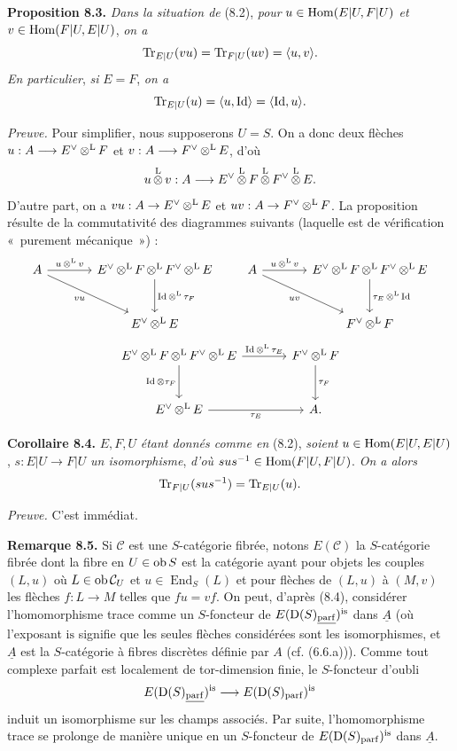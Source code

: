 \documentclass[11pt]{article}
\begin{document}
\textbf{Proposition 8.3.} \emph{Dans la situation de} (8.2), \emph{pour} \(u\in\operatorname{Hom}(E|U,F|U)\) \emph{et} \(v\in\operatorname{Hom}(F|U,E|U)\), \emph{on a}
\[
  \operatorname{Tr}_{E|U}(vu)=\operatorname{Tr}_{F|U}(uv)=\langle u,v\rangle.
\]
\emph{En particulier}, \emph{si} \(E=F\), \emph{on a}
\[
  \operatorname{Tr}_{E|U}(u)=\langle u,\operatorname{Id}\rangle=\langle\operatorname{Id},u\rangle.
\]

\emph{Preuve.} Pour simplifier, nous supposerons \(U=S\). On a donc deux flèches \(u:A\longrightarrow E^\vee\mathop{\otimes}^{\mathrm L} F\) et \(v:A\longrightarrow F^\vee\mathop{\otimes}^{\mathrm L} E\), d'où
\[
  u\mathop{\otimes}^{\mathrm L} v:A\longrightarrow E^\vee\mathop{\otimes}^{\mathrm L} F\mathop{\otimes}^{\mathrm L} F^\vee\mathop{\otimes}^{\mathrm L} E.
\]
D'autre part, on a \(vu:A\to E^\vee\mathop{\otimes}^{\mathrm L} E\) et \(uv:A\to F^\vee\mathop{\otimes}^{\mathrm L} F\). La proposition résulte de la commutativité des diagrammes suivants (laquelle est de vérification «~purement mécanique~») :
\[
\begin{tikzcd}[column sep=large,row sep=large]
 A \arrow[r,"u\otL v"] \arrow[dr,"vu"'] & E^\vee\otL F\otL F^\vee\otL E \arrow[d,"\Id\otL\tau_F"] \\
 & E^\vee\otL E
\end{tikzcd}
\qquad
\begin{tikzcd}[column sep=large,row sep=large]
 A \arrow[r,"u\otL v"] \arrow[dr,"uv"'] & E^\vee\otL F\otL F^\vee\otL E \arrow[d,"\tau_E\otL\Id"] \\
 & F^\vee\otL F
\end{tikzcd}
\]
\[
\begin{tikzcd}[column sep=
large,row sep=large]
E^\vee\otL F\otL F^\vee\otL E \arrow[r,"\Id\otL\tau_E"] \arrow[d,"\Id\otimes\tau_F"'] & F^\vee\otL F \arrow[d,"\tau_F"]\\
E^\vee\otL E \arrow[r,"\tau_E"'] & A .
\end{tikzcd}
\]

\textbf{Corollaire 8.4.} \(E,F,U\) \emph{étant donnés comme en} (8.2), \emph{soient} \(u\in\operatorname{Hom}(E|U,E|U)\), \(s:E|U\to F|U\) \emph{un isomorphisme}, \emph{d'où} \(sus^{-1}\in\operatorname{Hom}(F|U,F|U)\). \emph{On a alors}
\[
  \operatorname{Tr}_{F|U}(sus^{-1})=\operatorname{Tr}_{E|U}(u).
\]

\emph{Preuve.} C'est immédiat.

\textbf{Remarque 8.5.} Si \(\mathcal C\) est une \(S\)-catégorie fibrée, notons \(E(\mathcal C)\) la \(S\)-catégorie fibrée dont la fibre en \(U\in\operatorname{ob} S\) est la catégorie ayant pour objets les couples \((L,u)\) où \(L\in\operatorname{ob}\mathcal C_U\) et \(u\in\operatorname{End}_S(L)\) et pour flèches de \((L,u)\) à \((M,v)\) les flèches \(f:L\to M\) telles que \(fu=vf\). On peut, d'après (8.4), considérer l'homomorphisme trace comme un \(S\)-foncteur de \(E(\mathrm D(S)_{\underline{\operatorname{parf}}})^{\mathrm{is}}\) dans \(\underline A\) (où l'exposant \(\mathrm{is}\) signifie que les seules flèches considérées sont les isomorphismes, et \(\underline A\) est la \(S\)-catégorie à fibres discrètes définie par \(A\) (cf. (6.6.a))). Comme tout complexe parfait est localement de tor-dimension finie, le \(S\)-foncteur d'oubli
\[
  E(\mathrm D(S)_{\underline{\operatorname{parf}}})^{\mathrm{is}}
  \longrightarrow
  E(\mathrm D(S)_{\operatorname{parf}})^{\mathrm{is}}
\]
induit un isomorphisme sur les champs associés. Par suite, l'homomorphisme
trace se prolonge de manière unique en un \(S\)-foncteur de \(E(\mathrm D(S)_{\operatorname{parf}})^{\mathrm{is}}\) dans \(\underline A\).
\end{document}
